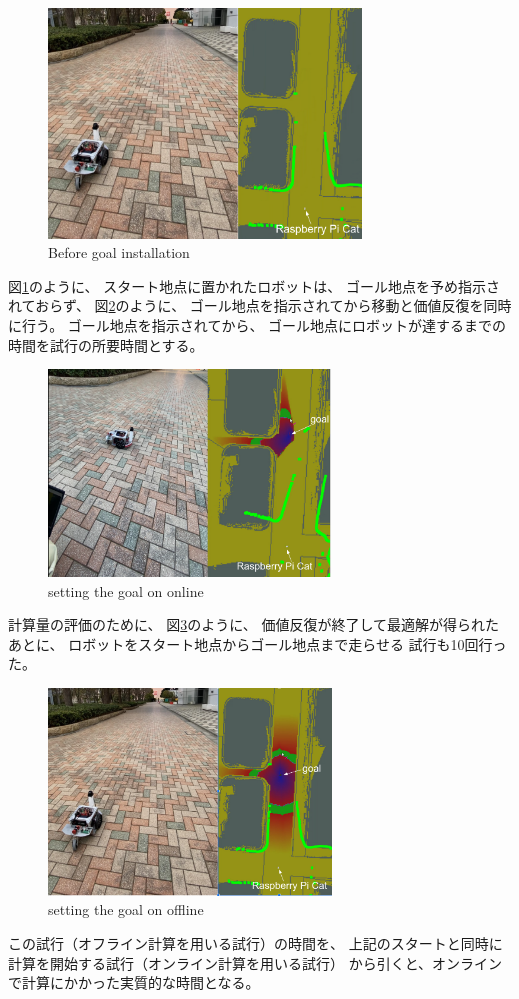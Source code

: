 \documentclass{jarticle}
\begin{document}
\begin{figure}[htb]
  \centering
   \includegraphics[height=61mm]{./figs/raspicat-start.png}
   \caption{Before goal installation}
	\label{fig:raspicat-start}
\end{figure}

図\ref{fig:raspicat-start}のように、
スタート地点に置かれたロボットは、
ゴール地点を予め指示されておらず、
図\ref{fig:raspicat-no-local}のように、
ゴール地点を指示されてから移動と価値反復を同時に行う。
ゴール地点を指示されてから、
ゴール地点にロボットが達するまでの時間を試行の所要時間とする。

\begin{figure}[htb]
  \centering
   \includegraphics[height=55mm]{./figs/raspicat-no-local.png}
   \caption{setting the goal on online}
	\label{fig:raspicat-no-local}
\end{figure}

計算量の評価のために、
図\ref{fig:raspicat-after-planning}のように、
価値反復が終了して最適解が得られたあとに、
ロボットをスタート地点からゴール地点まで走らせる
試行も10回行った。
\begin{figure}[htb]
  \centering
   \includegraphics[height=55mm]{./figs/raspicat-after-planning.png}
   \caption{setting the goal on offline}
	\label{fig:raspicat-after-planning}
\end{figure}
この試行（オフライン計算を用いる試行）の時間を、
上記のスタートと同時に計算を開始する試行（オンライン計算を用いる試行）
から引くと、オンラインで計算にかかった実質的な時間となる。
\end{document}
